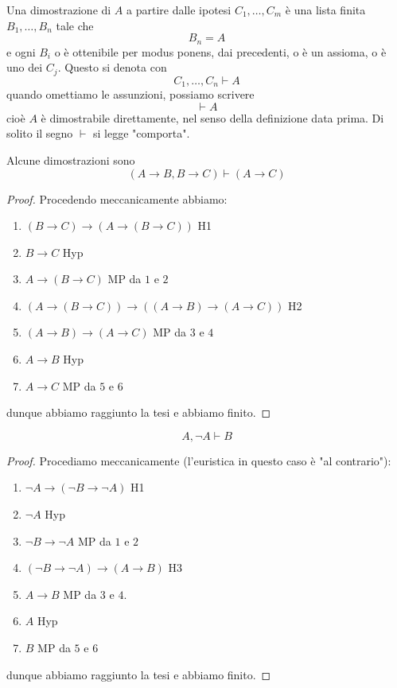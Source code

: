 \documentclass[11pt]{scrartcl}
\begin{document}
	\begin{definition}
		Una dimostrazione di $A$ a partire dalle ipotesi $C_1,\dots,C_m$ è una lista finita $B_1,\dots,B_n$ tale che 
		$$B_n=A$$
		e ogni $B_i$ o è ottenibile per modus ponens, dai precedenti, o è un assioma, o è uno dei $C_j$. Questo si denota con
		$$C_1,\dots,C_n \vdash A$$
		quando omettiamo le assunzioni, possiamo scrivere
		$$\vdash A$$
		cioè $A$ è dimostrabile direttamente, nel senso della definizione data prima. Di solito il segno $\vdash$ si legge "comporta".
	\end{definition}
	\begin{example}
		Alcune dimostrazioni sono
		$$(A\to B,B\to C)\vdash( A\to C)$$
		\begin{proof}
			Procedendo meccanicamente abbiamo:
			\begin{enumerate}
				\item $(B\to C) \to (A \to (B\to C))$ H1 
				\item $B\to C$ Hyp 
				\item $A\to (B\to C)$  MP da $1$ e $2$
				\item $(A\to (B\to C))\to ((A\to B)\to (A \to C))$ H2 
				\item $(A\to B)\to (A\to C)$ MP da $3$ e $4$
				\item $A\to B$ Hyp 
				\item $A\to C$ MP da $5$ e $6$
			\end{enumerate}
			dunque abbiamo raggiunto la tesi e abbiamo finito.
		\end{proof}
	\end{example}
	\begin{theorem}
		$$A,\lnot A \vdash B$$
	\end{theorem}
	\begin{proof}
		Procediamo meccanicamente (l'euristica in questo caso è "al contrario"):
		\begin{enumerate}
			\item $\lnot A \to (\lnot B \to \lnot A)$ H1
			\item $\lnot A$ Hyp
			\item $\lnot B \to \lnot A$ MP da $1$ e $2$
			\item $(\lnot B \to \lnot A) \to (A\to B)$ H3 
			\item $A\to B$ MP da $3$ e $4$.
			\item $A$ Hyp
			\item $B$ MP da $5$ e $6$
		\end{enumerate}
		dunque abbiamo raggiunto la tesi e abbiamo finito.
	\end{proof}
\end{document}
